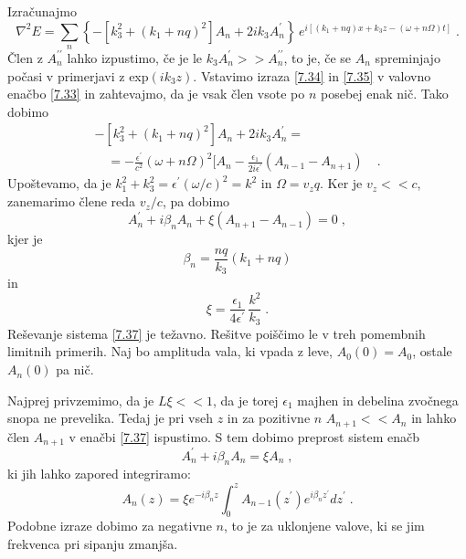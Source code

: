 Izračunajmo 
\begin{equation}
\nabla^{2}E=\sum_{n}\left\{ -[k_{3}^{2}+(k_{1}+nq)^{2}]A_{n}+2ik_{3}A_{n}^{\prime}\right\} \, e^{i[(k_{1}+nq)x+k_{3}z-(\omega+n\Omega)t]}\;.\label{7.35}
\end{equation}
 Člen z $A_{n}^{\prime\prime}$ lahko izpustimo, če je le $k_{3}A_{n}^{\prime}>>A_{n}^{\prime\prime}$,
to je, če se $A_{n}$ spreminjajo počasi v primerjavi z exp$(ik_{3}z)$.
Vstavimo izraza \ref{7.34} in \ref{7.35} v valovno enačbo \ref{7.33}
in zahtevajmo, da je vsak člen vsote po $n$ posebej enak nič. Tako
dobimo 
\begin{eqnarray}
-[k_{3}^{2}+(k_{1}+nq)^{2}]A_{n}+2ik_{3}A_{n}^{\prime}=\nonumber \\
\quad=-\frac{\epsilon^{\prime}}{c^{2}}(\omega+n\Omega)^{2}[A_{n}-\frac{\epsilon_{1}}{2i\epsilon^{\prime}}(A_{n-1}-A_{n+1}) & \;.
\end{eqnarray}
 Upoštevamo, da je $k_{1}^{2}+k_{3}^{2}=\epsilon^{\prime}(\omega/c)^{2}=k^{2}$
in $\Omega=v_{z}q$. Ker je $v_{z}<<c$, zanemarimo člene reda $v_{z}/c$,
pa dobimo 
\begin{equation}
A_{n}^{\prime}+i\beta_{n}A_{n}+\xi(A_{n+1}-A_{n-1})=0\;,\label{7.37}
\end{equation}
 kjer je 
\begin{equation}
\beta_{n}=\frac{nq}{k_{3}}(k_{1}+nq)\label{7.38}
\end{equation}
 in 
\begin{equation}
\xi=\frac{\epsilon_{1}}{4\epsilon^{\prime}}\,\frac{k^{2}}{k_{3}}\;.\label{7.39}
\end{equation}
 Reševanje sistema \ref{7.37} je težavno. Rešitve poiščimo le v treh
pomembnih limitnih primerih. Naj bo amplituda vala, ki vpada z leve,
$A_{0}(0)=A_{0}$, ostale $A_{n}(0)$ pa nič.

Najprej privzemimo, da je $L\xi<<1$, da je torej $\epsilon_{1}$
majhen in debelina zvočnega snopa ne prevelika. Tedaj je pri vseh
$z$ in za pozitivne $n$ $A_{n+1}<<A_{n}$ in lahko člen $A_{n+1}$
v enačbi \ref{7.37} ispustimo. S tem dobimo preprost sistem enačb
\begin{equation}
A_{n}^{\prime}+i\beta_{n}A_{n}=\xi A_{n}\;,\label{7.40}
\end{equation}
 ki jih lahko zapored integriramo: 
\begin{equation}
A_{n}(z)=\xi e^{-i\beta_{n}z}\int_{0}^{z}A_{n-1}(z^{\prime})e^{i\beta_{n}z^{\prime}}dz^{\prime}\;.\label{7.41}
\end{equation}
 Podobne izraze dobimo za negativne $n$, to je za uklonjene valove,
ki se jim frekvenca pri sipanju zmanjša.

